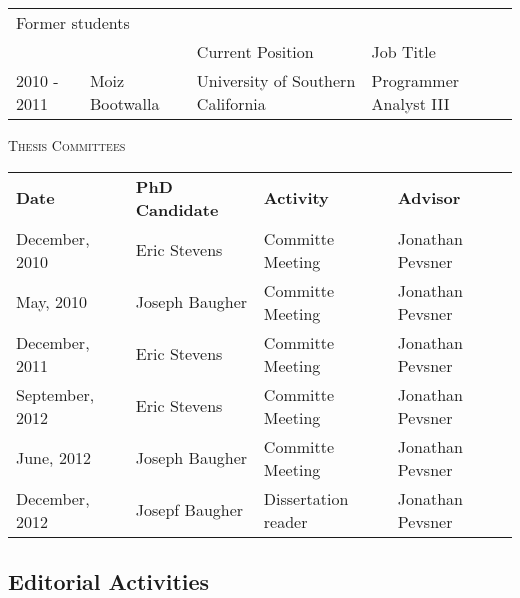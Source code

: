\documentclass[11pt]{article}%
\begin{document}
{\begin{tabular}{llll}
\multicolumn{4}{l}{Former students }\\
& & Current Position & Job Title \\[2pt]
 2010 - 2011 & Moiz Bootwalla & University of Southern California &
 Programmer Analyst III \\
\end{tabular}

\vspace{2pt}

\noindent\textsc{Thesis Committees}

\begin{tabular}{llll}
\textbf{Date} & \textbf{PhD Candidate} & \textbf{Activity} & \textbf{Advisor} \\
December, 2010 & Eric Stevens & Committe Meeting & Jonathan Pevsner\\
May, 2010 & Joseph Baugher & Committe Meeting & Jonathan
Pevsner\\

December, 2011 & Eric Stevens & Committe Meeting & Jonathan
Pevsner\\
September, 2012 & Eric Stevens & Committe Meeting & Jonathan
Pevsner\\
June, 2012 & Joseph Baugher & Committe Meeting & Jonathan
Pevsner\\
December, 2012 & Josepf Baugher & Dissertation reader & Jonathan Pevsner
\end{tabular}


\subsection*{\sc Editorial Activities}

}
\end{document}
